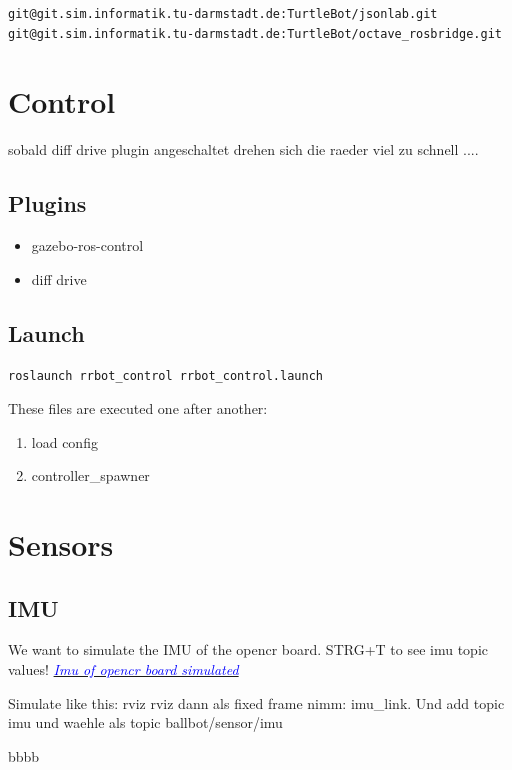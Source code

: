 \documentclass[twoside,colorback,accentcolor=tud4c,11pt]{tudreport}
\newcommand{\mylink}[2] {	\hyperlink{#1}{	\textit{\textcolor{blue}{#2}}}}
\begin{document}
	\begin{lstlisting}[style=BashInputStyle]
git@git.sim.informatik.tu-darmstadt.de:TurtleBot/jsonlab.git
git@git.sim.informatik.tu-darmstadt.de:TurtleBot/octave_rosbridge.git
	\end{lstlisting}
	
	\section{Control}
	sobald diff drive plugin angeschaltet drehen sich die raeder viel zu schnell ....
	
	
	\subsection{Plugins}
	\begin{itemize}
		\item gazebo-ros-control
		\item diff drive
	\end{itemize}
	
	\subsection{Launch}
	\begin{lstlisting}[style=BashInputStyle]
	roslaunch rrbot_control rrbot_control.launch
	\end{lstlisting}
	
	These files are executed one after another:
	\begin{enumerate}
		\item load config
		\item controller\_spawner
	\end{enumerate}
	
	\section{Sensors}
	\subsection{IMU}
	
		We want to simulate the IMU of the opencr board. STRG+T to see imu topic values!
	\mylink{https://www.youtube.com/watch?v=wXN_7oRHst0}{Imu of opencr board simulated}

	Simulate like this:
	rviz rviz dann als fixed frame nimm: imu\_link. Und add topic imu und waehle als topic ballbot/sensor/imu
	
	bbbb
	
\end{document}
